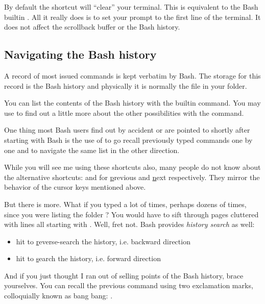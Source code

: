 \documentclass{olli-handout}
\begin{document}
By default the  shortcut will ``clear'' your terminal. This is equivalent to the Bash builtin . All it really does is to set your prompt to the first line of the terminal. It does not affect the scrollback buffer or the Bash history.

\subsection{Navigating the Bash history}\label{bash_history}

\begin{refmanbash}
\end{refmanbash}

A record of most issued commands is kept verbatim by Bash. The storage for this record is the Bash history and physically it is normally the file  in your \TT{\mytilde} folder.

You can list the contents of the Bash history with the  builtin command. You may use  to find out a little more about the other possibilities with the command.

One thing most Bash users find out by accident or are pointed to shortly after starting with Bash is the use of \keys{\arrowkeyup} to go recall previously typed commands one by one and \keys{\arrowkeydown} to navigate the same list in the other direction.

While you will see me using these shortcuts also, many people do not know about the alternative shortcuts:   and  for \underline{p}revious and \underline{n}ext respectively. They mirror the behavior of the cursor keys mentioned above.

But there is more. What if you typed  a lot of times, perhaps dozens of times, since you were listing the folder ? You would have to sift through pages cluttered with lines all starting with . Well, fret not. Bash provides \emph{history search} as well:

\begin{itemize}
	\item hit  to \underline{r}everse-search the history, i.e. backward direction
	\item hit  to \underline{s}earch the history, i.e. forward direction
\end{itemize}

And if you just thought I ran out of selling points of the Bash history, brace yourselves. You can recall the previous command using two exclamation marks, colloquially known as bang bang: \TT{!!}.
\end{document}
